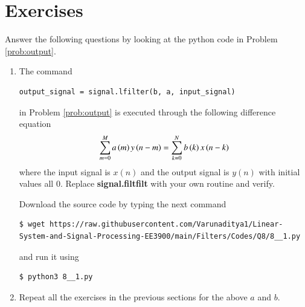 \documentclass[journal,12pt,twocolumn]{IEEEtran}
\renewcommand\thesection{\arabic{section}}
\begin{document}
\section{Exercises}
\noindent Answer the following questions by looking at the python code in Problem \ref{prob:output}.
\begin{enumerate}[label=\thesection.\arabic*.,ref=\thesection.\theenumi]
\item
The command
\begin{lstlisting}
output_signal = signal.lfilter(b, a, input_signal)
\end{lstlisting}
in Problem \ref{prob:output} is executed through the following difference equation
\begin{equation}
\label{eq:iir_filter_gen}
 \sum _{m=0}^{M}a\left(m\right)y\left(n-m\right)=\sum _{k=0}^{N}b\left(k\right)x\left(n-k\right)
\end{equation}
where the input signal is $x(n)$ and the output signal is $y(n)$ with initial values all 0. Replace
\textbf{signal.filtfilt} with your own routine and verify.

\solution
Download the source code by typing the next command \\
\begin{lstlisting}
$ wget https://raw.githubusercontent.com/Varunaditya1/Linear-System-and-Signal-Processing-EE3900/main/Filters/Codes/Q8/8__1.py
\end{lstlisting}
and run it using
\begin{lstlisting}
$ python3 8__1.py
\end{lstlisting}
\item Repeat all the exercises in the previous sections for the above $a$ and $b$.


\end{enumerate}
\end{document}
